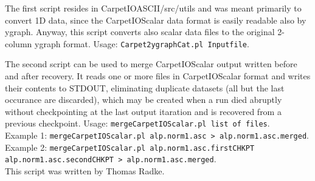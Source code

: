 The first script resides in CarpetIOASCII/src/utils and was meant primarily to convert 1D data,
since the CarpetIOScalar data format is easily readable also by ygraph. Anyway, this script converts
also scalar data files to the original 2-column ygraph format.
Usage: {\tt Carpet2ygraphCat.pl Inputfile}.

The second script can be used to merge CarpetIOScalar output written before and after recovery. It
reads one or more files in CarpetIOScalar format and writes their contents to STDOUT, eliminating
duplicate datasets (all but the last occurance are discarded), which may be created when a run died
abruptly without checkpointing at the last output itaration and is recovered from a previous
checkpoint.  
Usage: {\tt mergeCarpetIOScalar.pl list of files}. \\
Example 1: {\tt mergeCarpetIOScalar.pl alp.norm1.asc > alp.norm1.asc.merged}.\\ 
Example 2: {\tt mergeCarpetIOScalar.pl alp.norm1.asc.firstCHKPT alp.norm1.asc.secondCHKPT > alp.norm1.asc.merged}.\\
This script was written by Thomas Radke.


\begin{thebibliography}{9}

\end{thebibliography}



